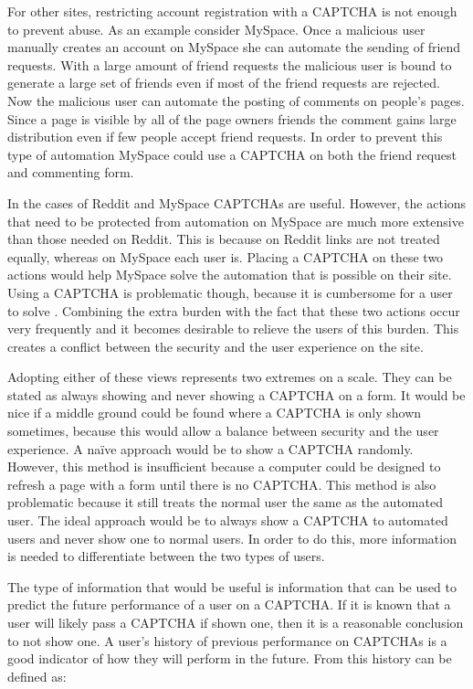 \documentclass[journal, 12pt, onecolumn, draftclsnofoot]{IEEEtran}
\begin{document}
For other sites, restricting account registration with a CAPTCHA is not enough to prevent abuse. As an example consider MySpace. Once a malicious user manually creates an account on MySpace she can automate the sending of friend requests. With a large amount of friend requests the malicious user is bound to generate a large set of friends even if most of the friend requests are rejected. Now the malicious user can automate the posting of comments on people’s pages. Since a page is visible by all of the page owners friends the comment gains large distribution even if few people accept friend requests. In order to prevent this type of automation MySpace could use a CAPTCHA on both the friend request and commenting form. 

In the cases of Reddit and MySpace CAPTCHAs are useful. However, the actions that need to be protected from automation on MySpace are much more extensive than those needed on Reddit. This is because on Reddit links are not treated equally, whereas on MySpace each user is. Placing a CAPTCHA on these two actions would help MySpace solve the automation that is possible on their site. Using a CAPTCHA is problematic though, because it is cumbersome for a user to solve \cite{yan, benasher}. Combining the extra burden with the fact that these two actions occur very frequently and it becomes desirable to relieve the users of this burden. This creates a conflict between the security and the user experience on the site. 

Adopting either of these views represents two extremes on a scale. They can be stated as always showing and never showing a CAPTCHA on a form. It would be nice if a middle ground could be found where a CAPTCHA is only shown sometimes, because this would allow a balance between security and the user experience. A naïve approach would be to show a CAPTCHA randomly. However, this method is insufficient because a computer could be designed to refresh a page with a form until there is no CAPTCHA. This method is also problematic because it still treats the normal user the same as the automated user. The ideal approach would be to always show a CAPTCHA to automated users and never show one to normal users. In order to do this, more information is needed to differentiate between the two types of users.

The type of information that would be useful is information that can be used to predict the future performance of a user on a CAPTCHA. If it is known that a user will likely pass a CAPTCHA if shown one, then it is a reasonable conclusion to not show one. A user’s history of previous performance on CAPTCHAs is a good indicator of how they will perform in the future. From this history can be defined as:
\end{document}
